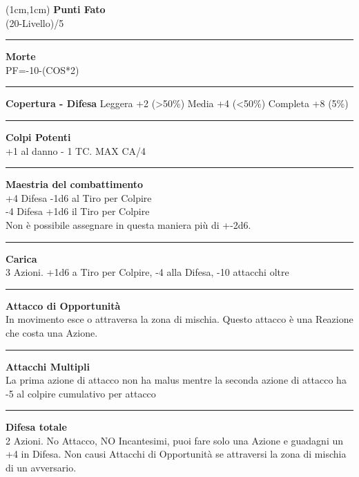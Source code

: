 \documentclass[a4paper,12 pt,openany]{book}
\newcommand{\riga}{\rule{\textwidth}{0.4pt}}
\begin{document}
\begin{textblock*}{4cm}(1cm,1cm) %
{\textbf{Punti Fato}\\
(20-Livello)/5}

\riga

{\textbf{Morte}\\
PF=-10-(COS*2)}

\riga

\textbf{Copertura - Difesa}
Leggera +2 (>50\%)
Media +4 (<50\%)
Completa +8 (5\%)

\riga

\textbf{Colpi Potenti}\\
+1 al danno - 1 TC. MAX CA/4

\riga

\textbf{Maestria del combattimento}\\
+4 Difesa -1d6 al Tiro per Colpire\\
-4 Difesa +1d6 il Tiro per Colpire \\
Non è possibile assegnare in questa maniera più di +-2d6.

\riga

\textbf{Carica}\\
3 Azioni. +1d6 a Tiro per Colpire, -4 alla Difesa, -10 attacchi oltre

\riga

\textbf{Attacco di Opportunità}\\
In movimento esce o attraversa la zona di mischia. Questo attacco è una Reazione che costa una Azione.

\riga

\textbf{Attacchi Multipli}\\
La prima azione di attacco non ha malus mentre la seconda azione di attacco ha -5 al colpire cumulativo per attacco

\riga

\textbf{Difesa totale}\\
2 Azioni. No Attacco, NO Incantesimi, puoi fare solo una Azione e guadagni un +4 in Difesa. Non causi Attacchi di Opportunità se attraversi la zona di mischia di un avversario.

\end{textblock*}
\end{document}
